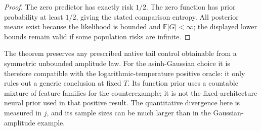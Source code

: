 \begin{proof}
The zero predictor has exactly risk $1/2$. The zero function has prior probability at least $1/2$, giving the
stated comparison entropy. All posterior
means exist because the likelihood is bounded and
$\mathbb E|G|<\infty$; the displayed lower bounds remain valid if
some population risks are infinite.
\end{proof}

The theorem preserves any prescribed native tail control obtainable
from a symmetric unbounded amplitude law. For the asinh-Gaussian
choice it is therefore compatible with the logarithmic-temperature
positive oracle: it only rules out a generic conclusion at fixed
$T$. Its function prior uses a countable mixture of feature families
for the counterexample; it is not the fixed-architecture neural prior
used in that positive result. The quantitative divergence here is
measured in $j$, and its sample sizes can be much larger than in the
Gaussian-amplitude example.
